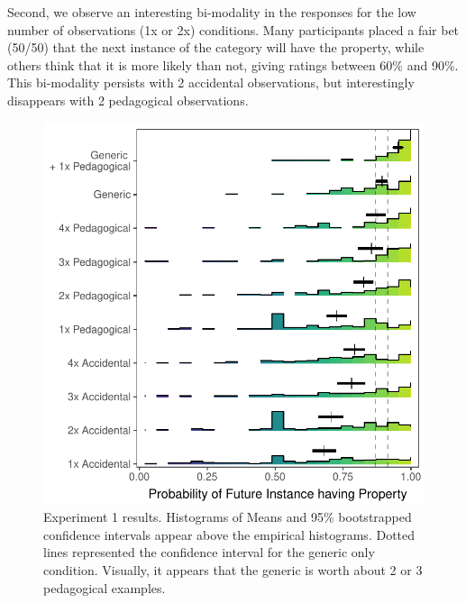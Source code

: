 \documentclass[10pt,letterpaper]{article}
\newcommand{\mht}[1]{\textcolor{Blue}{[mht: #1]}}
\begin{document}
Second, we observe an interesting bi-modality in the responses for the low number of observations (1x or 2x) conditions. 
Many participants placed a fair bet (50/50) that the next instance of the category will have the property, while others think that it is more likely than not, giving ratings between 60\% and 90\%. 
This bi-modality persists with 2 accidental observations, but interestingly disappears with 2 pedagogical observations. 




\begin{figure}[t]
\begin{center}
\includegraphics[width=\linewidth]{figs/genex-pilots_10conditions_reordered.pdf}
\end{center}
\caption{Experiment 1 results. Histograms of  Means and 95\% bootstrapped confidence intervals appear above the empirical histograms. Dotted lines represented the confidence interval for the generic only condition. Visually, it appears that the generic is worth about 2 or 3 pedagogical examples.}
\label{fig:results}
\end{figure}
\end{document}
